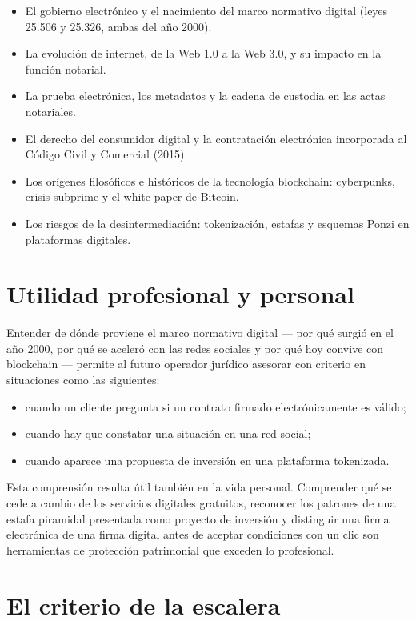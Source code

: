 \documentclass[12pt,oneside]{book}
\begin{document}
\begin{itemize}
    \item El gobierno electrónico y el nacimiento del marco normativo digital (leyes 25.506 y 25.326, ambas del año 2000).
    \item La evolución de internet, de la Web 1.0 a la Web 3.0, y su impacto en la función notarial.
    \item La prueba electrónica, los metadatos y la cadena de custodia en las actas notariales.
    \item El derecho del consumidor digital y la contratación electrónica incorporada al Código Civil y Comercial (2015).
    \item Los orígenes filosóficos e históricos de la tecnología blockchain: cyberpunks, crisis subprime y el white paper de Bitcoin.
    \item Los riesgos de la desintermediación: tokenización, estafas y esquemas Ponzi en plataformas digitales.
\end{itemize}

\section{Utilidad profesional y personal}

Entender de dónde proviene el marco normativo digital --- por qué surgió en el año 2000, por qué se aceleró con las redes sociales y por qué hoy convive con blockchain --- permite al futuro operador jurídico asesorar con criterio en situaciones como las siguientes:

\begin{itemize}
    \item cuando un cliente pregunta si un contrato firmado electrónicamente es válido;
    \item cuando hay que constatar una situación en una red social;
    \item cuando aparece una propuesta de inversión en una plataforma tokenizada.
\end{itemize}

Esta comprensión resulta útil también en la vida personal. Comprender qué se cede a cambio de los servicios digitales gratuitos, reconocer los patrones de una estafa piramidal presentada como proyecto de inversión y distinguir una firma electrónica de una firma digital antes de aceptar condiciones con un clic son herramientas de protección patrimonial que exceden lo profesional.

\section{El criterio de la escalera}
\end{document}
